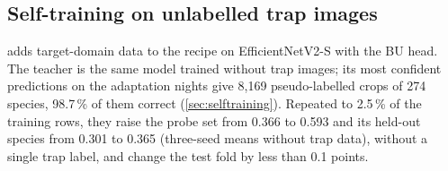 \subsection{Self-training on unlabelled trap images}\label{sec:results_selftraining}
 adds target-domain data to the recipe on EfficientNetV2-S with the BU head.
The teacher is the same model trained without trap images; its most confident predictions on the adaptation nights give 8,169 pseudo-labelled crops of 274 species, 98.7\,\% of them correct (\cref{sec:selftraining}).
Repeated to 2.5\,\% of the training rows, they raise the probe set from 0.366 to 0.593 and its held-out species from 0.301 to 0.365 (three-seed means without trap data), without a single trap label, and change the test fold by less than 0.1 points.

